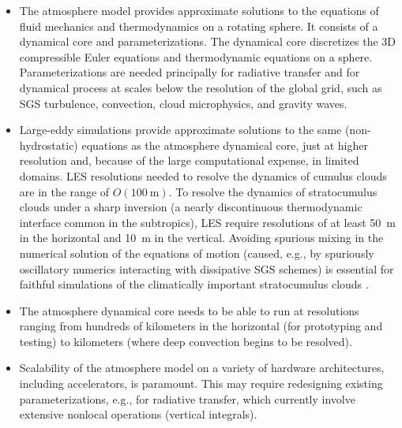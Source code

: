 \documentclass{article}
\begin{document}
\begin{itemize}
    \item The atmosphere model provides approximate solutions to the equations of fluid mechanics and thermodynamics on a rotating sphere. It consists of a dynamical core and parameterizations. The dynamical core discretizes the 3D compressible Euler equations and thermodynamic equations on a sphere. Parameterizations are needed principally for radiative transfer and for dynamical process at scales below the resolution of the global grid, such as SGS turbulence, convection, cloud microphysics, and gravity waves.
    \item Large-eddy simulations provide approximate solutions to the same (non-hydrostatic) equations as the atmosphere dynamical core, just at higher resolution and, because of the large computational expense, in limited domains. LES resolutions needed to resolve the dynamics of cumulus clouds are in the range of $O(100~\mathrm{m})$. To resolve the dynamics of stratocumulus clouds under a sharp inversion (a nearly discontinuous thermodynamic interface common in the subtropics), LES require resolutions of at least 50~m in the horizontal and 10~m in the vertical. Avoiding spurious mixing in the numerical solution of the equations of motion (caused, e.g., by spuriously oscillatory numerics interacting with dissipative SGS schemes) is essential for faithful simulations of the climatically important stratocumulus clouds \citep{Pressel17a}.
    \item The atmosphere dynamical core needs to be able to run at resolutions ranging from hundreds of kilometers in the horizontal (for prototyping and testing) to kilometers (where deep convection begins to be resolved).
    \item Scalability of the atmosphere model on a variety of hardware architectures, including accelerators, is paramount. This may require redesigning existing parameterizations, e.g., for radiative transfer, which currently involve extensive nonlocal operations (vertical integrals). 

\end{itemize}
\end{document}
